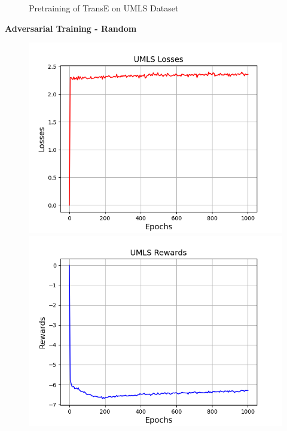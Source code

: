 \begin{figure}
\begin{minipage}{.3\textwidth}
    \end{minipage}%
    \caption{Pretraining of TransE on UMLS Dataset}
    \label{fig:test}
\end{figure}

\pagebreak

\textbf{Adversarial Training - Random}\\
\begin{figure}
    \centering
    \begin{minipage}{.5\textwidth}
      \centering
      \includegraphics[width=0.9\linewidth]{figures/results/UMLS/AdversarialTraining/Random/gan_train_umls_losses.png}
    \end{minipage}%
    \begin{minipage}{.5\textwidth}
      \centering
      \includegraphics[width=0.9\linewidth]{figures/results/UMLS/AdversarialTraining/Random/gan_train_umls_rewards.png}

\end{minipage}
\end{figure}
